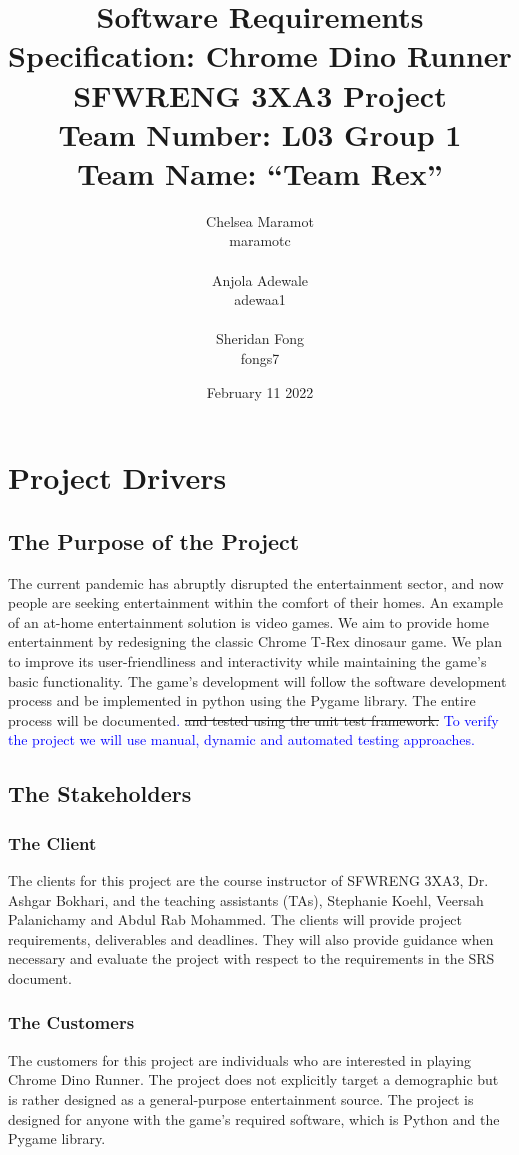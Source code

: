 \documentclass[12pt]{article}
\title{Software Requirements Specification: Chrome Dino Runner \\ \bigskip \large SFWRENG 3XA3 Project \\ \bigskip \large Team Number: L03 Group 1 \\ \large Team Name: ``Team Rex'' }
\author{Chelsea Maramot \\ maramotc \\ \\ Anjola Adewale \\ adewaa1 \\ \\ Sheridan Fong \\ fongs7 }
\date{February 11 2022}
\begin{document}
	
	\maketitle
	\newpage
	\tableofcontents
	\section{Project Drivers}
	\subsection{The Purpose of the Project}
	The current pandemic has abruptly disrupted the entertainment sector, and now people are seeking entertainment within the comfort of their homes. An example of an at-home entertainment solution is video games. We aim to provide home entertainment by redesigning the classic Chrome T-Rex dinosaur game. We plan to improve its user-friendliness and interactivity while maintaining the game’s basic functionality. The game's development will follow the software development process and be implemented in python using the Pygame library. The entire process will be documented\textcolor{blue}{.} \sout{and tested using the unit test framework.}  \textcolor{blue}{To verify the project we will use manual, dynamic and automated testing approaches.}
	\subsection{The Stakeholders}
	\subsubsection{The Client}
	The clients for this project are the course instructor of SFWRENG 3XA3, Dr. Ashgar Bokhari, and the teaching assistants (TAs), Stephanie Koehl, Veersah Palanichamy and Abdul Rab Mohammed. The clients will provide project requirements, deliverables and deadlines. They will also provide guidance when necessary and evaluate the project with respect to the requirements in the SRS document. 
	\subsubsection{The Customers}
	The customers for this project are individuals who are interested in playing Chrome Dino Runner. The project does not explicitly target a demographic but is rather designed as a general-purpose entertainment source. The project is designed for anyone with the game's required software, which is Python and the Pygame library. 
\end{document}
